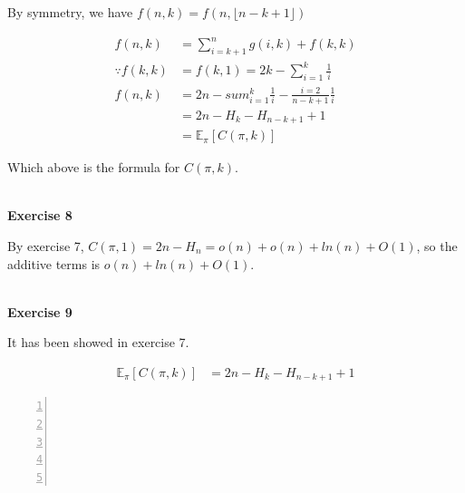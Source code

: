 \documentclass{article}
\begin{document}
    By symmetry, we have $f(n,k) = f(n, \lfloor n-k+1 \rfloor  )$
    
\begin{align}
    f(n,k) &= \sum_{i=k+1}^{n} g(i,k) + f(k,k)\\
    \because f(k,k) &= f(k,1) = 2k - \sum_{i=1}^{k} \frac{1}{i}\\
    f(n,k) &= 2n - sum_{i=1}^{k} \frac{1}{i} - \frac{i=2}{n-k+1} \frac{1}{i}\\
    &= 2n - H_{k} - H_{n-k+1} + 1\\
    &= \mathds{E}_{\pi} [C(\pi , k)]
\end{align}

Which above is the formula for $C(\pi, k)$.

~\\
\textbf{Exercise 8}

By exercise 7, $C(\pi ,1) = 2n - H_{n} = o(n) + o(n) + ln(n) + O(1)$, so the additive terms is $o(n) + ln(n) + O(1)$.

~\\
\textbf{Exercise 9}

It has been showed in exercise 7.

\begin{align*}
     \mathds{E}_{\pi} [C(\pi , k)]&= 2n - H_{k} - H_{n-k+1} + 1
\end{align*}
   


\begin{colorboxed}  
\begin{lstlisting}[language={[ANSI]C},numbers=left,numberstyle=\tiny,%frame=shadowbox,  
   rulesepcolor=\color{red!20!green!20!blue!20},  
   keywordstyle=\color{blue!70!black},  
   commentstyle=\color{blue!90!},  
   basicstyle=\ttfamily]  
    
    
    
   
   
   \end{lstlisting}  
\end{colorboxed}  
\end{document}
